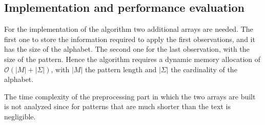 \documentclass{article}
\begin{document}
\subsection{Implementation and performance evaluation}

For the implementation of the algorithm two additional arrays are needed. The first one to store the information required to apply the first observations, and it has the size of the alphabet. The second one for the last observation, with the size of the pattern. Hence the algorithm requires a dynamic memory allocation of $\mathcal{O}(|M|+|\Sigma|)$, with $|M|$ the pattern length and $|\Sigma|$ the cardinality of the alphabet.

The time complexity of the preprocessing part in which the two arrays are built is not analyzed since for patterns that are much shorter than the text is negligible.
\end{document}
